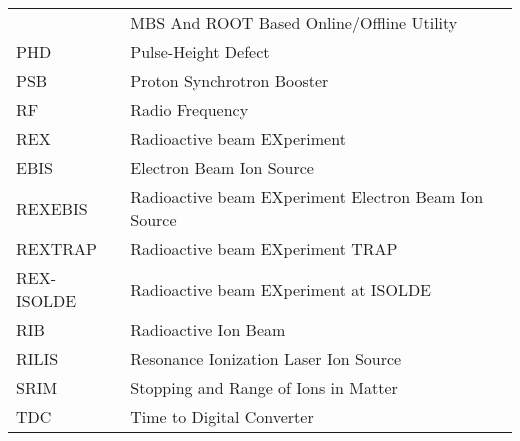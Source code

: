 \begin{tabular}{ll}
                &  MBS And ROOT Based Online/Offline Utility                  \\
    PHD         &  Pulse-Height Defect                                        \\
    PSB         &  Proton Synchrotron Booster                                 \\
    RF          &  Radio Frequency                                            \\
    REX         &  Radioactive beam EXperiment                                \\
    EBIS        &  Electron Beam Ion Source                                   \\
    REXEBIS     &  Radioactive beam EXperiment Electron Beam Ion Source       \\
    REXTRAP     &  Radioactive beam EXperiment TRAP                           \\
    REX-ISOLDE  &  Radioactive beam EXperiment at ISOLDE                      \\
    RIB         &  Radioactive Ion Beam                                       \\
    RILIS       &  Resonance Ionization Laser Ion Source                      \\
    SRIM        &  Stopping and Range of Ions in Matter                       \\
    TDC         &  Time to Digital Converter                                  \\
    \hline
\end{tabular}